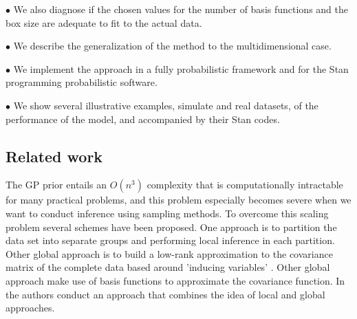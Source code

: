 \documentclass[]{interact}
\theoremstyle{plain}%
\theoremstyle{definition}
\theoremstyle{remark}
\begin{document}
\vspace{2mm}
$\bullet$ We also diagnose if the chosen values for the number of basis functions and the box size are adequate to fit to the actual data.

\vspace{2mm}
$\bullet$ We describe the generalization of the method to the multidimensional case.

\vspace{2mm}
$\bullet$ We implement the approach in a fully probabilistic framework and for the Stan programming probabilistic software.

\vspace{2mm}
$\bullet$ We show several illustrative examples, simulate and real datasets, of the performance of the model, and accompanied by their Stan codes.

 

\subsection{Related work}

The GP prior entails an $O(n^3)$ complexity that is computationally intractable for many practical problems, and this problem especially becomes severe when we want to conduct inference using sampling methods. To overcome this scaling problem several schemes have been proposed. One approach is to partition the data set into separate groups \citep{snelson2007local, urtasun2008sparse} and performing local inference in each partition. Other global approach is to build a low-rank approximation to the covariance matrix of the complete data based around 'inducing variables' \citep{quinonero2005unifying,bui2017unifying}. Other global approach make use of basis functions to approximate the covariance function. In \cite{snelson2007local} the authors conduct an approach that combines the idea of local and global approaches.
\end{document}
